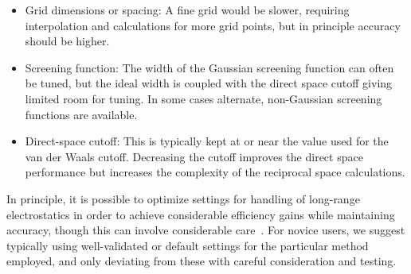 \documentclass[9pt,bestpractices]{livecoms}
\begin{document}
\begin{itemize}
\item Grid dimensions or spacing: A fine grid would be slower, requiring interpolation and calculations for more grid points, but in principle accuracy should be higher.
\item Screening function: The width of the Gaussian screening function can often be tuned, but the ideal width is coupled with the direct space cutoff giving limited room for tuning. In some cases alternate, non-Gaussian screening functions are available.
\item Direct-space cutoff: This is typically kept at or near the value used for the van der Waals cutoff.
Decreasing the cutoff improves the direct space performance but increases the complexity of the reciprocal space calculations.
\end{itemize}

In principle, it is possible to optimize settings for handling of long-range electrostatics in order to achieve considerable efficiency gains while maintaining accuracy, though this can involve considerable care~\cite{Paliwal:2013:J.Chem.TheoryComput.}.
For novice users, we suggest typically using well-validated or default settings for the particular method employed, and only deviating from these with careful consideration and testing.
\end{document}
